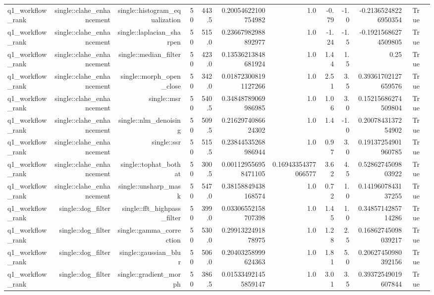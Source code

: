 \begin{tabular}{lrrrrrrrrrrr}
q1\_workflow\_rank & single::clahe\_enhancement & single::histogram\_equalization & 50 & 443.5 & 0.20054622100754982 & 1.0 & -0.79 & -1.0 & -0.21365248226950354 & True &  \\
q1\_workflow\_rank & single::clahe\_enhancement & single::laplacian\_sharpen & 50 & 515.0 & 0.23667982988892977 & 1.0 & -1.24 & -1.5 & -0.19215686274509805 & True &  \\
q1\_workflow\_rank & single::clahe\_enhancement & single::median\_filter & 50 & 423.0 & 0.13536213848681924 & 1.0 & 1.44 & 1.5 & 0.25 & True &  \\
q1\_workflow\_rank & single::clahe\_enhancement & single::morph\_open\_close & 50 & 342.0 & 0.018723008191127266 & 1.0 & 2.51 & 3.5 & 0.39361702127659576 & True &  \\
q1\_workflow\_rank & single::clahe\_enhancement & single::msr & 50 & 540.5 & 0.34848789069986985 & 1.0 & 1.06 & 3.0 & 0.15215686274509804 & True &  \\
q1\_workflow\_rank & single::clahe\_enhancement & single::nlm\_denoising & 50 & 509.5 & 0.2162974086624302 & 1.0 & 1.4 & -1.0 & 0.2007843137254902 & True &  \\
q1\_workflow\_rank & single::clahe\_enhancement & single::ssr & 50 & 515.5 & 0.23844535268986944 & 1.0 & 0.97 & 3.0 & 0.19137254901960785 & True &  \\
q1\_workflow\_rank & single::clahe\_enhancement & single::tophat\_bothat & 50 & 300.5 & 0.001129556958471105 & 0.16943354377066577 & 3.62 & 4.5 & 0.5286274509803922 & True &  \\
q1\_workflow\_rank & single::clahe\_enhancement & single::unsharp\_mask & 50 & 547.0 & 0.38158849438168574 & 1.0 & 0.72 & 1.0 & 0.1419607843137255 & True &  \\
q1\_workflow\_rank & single::dog\_filter & single::fft\_highpass\_filter & 50 & 399.0 & 0.03306552158707398 & 1.0 & 1.45 & 1.0 & 0.3485714285714286 & True &  \\
q1\_workflow\_rank & single::dog\_filter & single::gamma\_correction & 50 & 530.0 & 0.2991322491878975 & 1.0 & 1.28 & 2.5 & 0.16862745098039217 & True &  \\
q1\_workflow\_rank & single::dog\_filter & single::gaussian\_blur & 50 & 506.0 & 0.20403258999624363 & 1.0 & 1.81 & 5.0 & 0.20627450980392156 & True &  \\
q1\_workflow\_rank & single::dog\_filter & single::gradient\_morph & 50 & 386.5 & 0.015334921455859147 & 1.0 & 3.01 & 3.5 & 0.39372549019607844 & True &  \\

\end{tabular}
